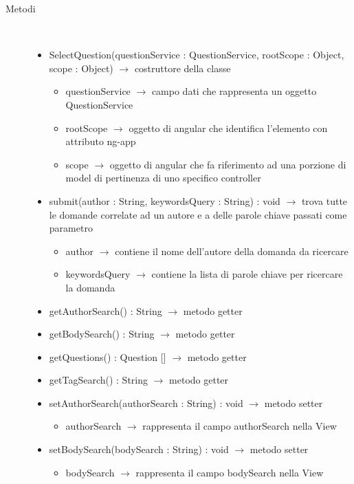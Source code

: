 \begin{description}
\item[Metodi] \hfill \\
\vspace{-7mm}
\begin{itemize}
	\item SelectQuestion(questionService : QuestionService, rootScope : Object, scope : Object) $\rightarrow$ costruttore della classe\begin{itemize}
		\item questionService $\rightarrow$ campo dati che rappresenta un oggetto QuestionService
		\item rootScope $\rightarrow$ oggetto di angular che identifica l’elemento con attributo ng-app
		\item scope $\rightarrow$ oggetto di angular che fa riferimento ad una porzione di model di pertinenza di uno specifico controller
	\end{itemize}
	
	\item submit(author : String, keywordsQuery : String) : void $\rightarrow$ trova tutte le domande correlate ad un autore e a delle parole chiave passati come parametro\begin{itemize}
		\item author $\rightarrow$ contiene il nome dell'autore della domanda da ricercare 
		\item keywordsQuery $\rightarrow$ contiene la lista di parole chiave per ricercare la domanda
	\end{itemize}
	
	\item getAuthorSearch() : String $\rightarrow$ metodo getter
	\item getBodySearch() : String $\rightarrow$ metodo getter
	\item getQuestions() : Question [] $\rightarrow$ metodo getter
	\item getTagSearch() : String $\rightarrow$ metodo getter
	\item setAuthorSearch(authorSearch : String) : void $\rightarrow$ metodo setter\begin{itemize}
		\item authorSearch $\rightarrow$ rappresenta il campo authorSearch nella View
	\end{itemize}
	
	\item setBodySearch(bodySearch : String) : void $\rightarrow$ metodo setter\begin{itemize}
		\item bodySearch $\rightarrow$ rappresenta il campo bodySearch nella View
	\end{itemize}
	

\end{itemize}
\end{description}
